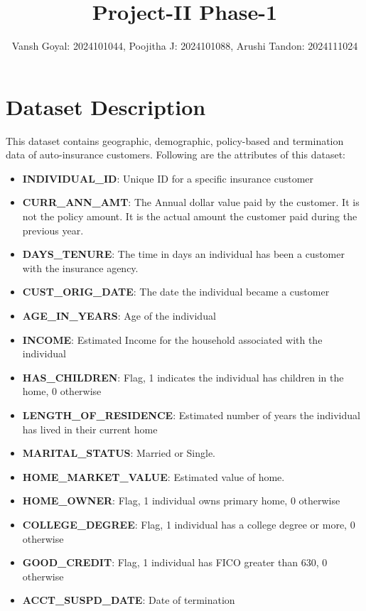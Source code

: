 \documentclass[10pt,a4paper]{article}
\title{\vspace{-1.5cm}\textbf{Project-II Phase-1}}
\author{Vansh Goyal: 2024101044, Poojitha J: 2024101088, Arushi Tandon: 2024111024}
\date{}
\begin{document}
\maketitle
\vspace{-1cm}

\section*{Dataset Description}
This dataset contains geographic, demographic, policy-based and termination data of auto-insurance customers. Following are the attributes of this dataset:

\begin{itemize}[itemsep=1pt]
    \item \textbf{INDIVIDUAL\_ID}: Unique ID for a specific insurance customer
    \item \textbf{CURR\_ANN\_AMT}: The Annual dollar value paid by the customer. It is not the policy amount. It is the actual amount the customer paid during the previous year.
    \item \textbf{DAYS\_TENURE}: The time in days an individual has been a customer with the insurance agency.
    \item \textbf{CUST\_ORIG\_DATE}: The date the individual became a customer
    \item \textbf{AGE\_IN\_YEARS}: Age of the individual
    \item \textbf{INCOME}: Estimated Income for the household associated with the individual
    \item \textbf{HAS\_CHILDREN}: Flag, 1 indicates the individual has children in the home, 0 otherwise
    \item \textbf{LENGTH\_OF\_RESIDENCE}: Estimated number of years the individual has lived in their current home
    \item \textbf{MARITAL\_STATUS}: Married or Single.
    \item \textbf{HOME\_MARKET\_VALUE}: Estimated value of home.
    \item \textbf{HOME\_OWNER}: Flag, 1 individual owns primary home, 0 otherwise
    \item \textbf{COLLEGE\_DEGREE}: Flag, 1 individual has a college degree or more, 0 otherwise
    \item \textbf{GOOD\_CREDIT}: Flag, 1 individual has FICO greater than 630, 0 otherwise
    \item \textbf{ACCT\_SUSPD\_DATE}: Date of termination
\end{itemize}
\end{document}
